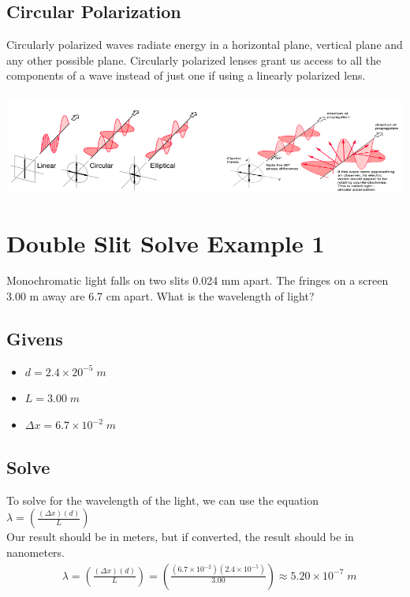 \documentclass{article}
\begin{document}
\subsection{Circular Polarization}
Circularly polarized waves radiate energy in a horizontal plane, vertical plane and any other possible plane. Circularly polarized lenses grant us access to all the components of a wave instead of just one if using a linearly polarized lens.\\\\
\includegraphics[scale=0.5]{images/circular_polarization}\\

\section{Double Slit Solve Example 1}
Monochromatic light falls on two slits 0.024 mm apart. The fringes on a screen 3.00 m away are 6.7 cm apart. What is the wavelength of light?
\subsection*{Givens}
\begin{itemize}
    \item $d = 2.4 \times 20^{-5}\;m$
    \item $L = 3.00\;m $
    \item $\Delta x = 6.7 \times 10^{-2}\;m$
\end{itemize}\leavevmode
\subsection*{Solve}
To solve for the wavelength of the light, we can use the equation $\lambda = \left(\frac{(\Delta x)(d)}{L}\right)$\\ Our result should be in meters, but if converted, the result should be in nanometers.\\
\begin{align*}
     & \lambda = \left(\frac{(\Delta x)(d)}{L}\right)      = \left(\frac{(6.7 \times 10^{-2})(2.4 \times 10^{-5})}{3.00}\right) \approx 5.20 \times 10^{-7}\;m
\end{align*}\leavevmode\\
\end{document}
